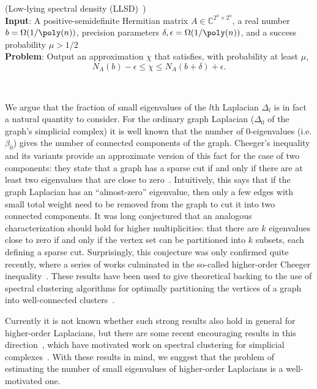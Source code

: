 \documentclass[11pt]{article}
\numberwithin{equation}{section}
\newcommand\equ[1] {\begin{equation}#1\end{equation}}
\renewcommand\( {\left(}
\renewcommand\) {\right)}
\newcounter{mycount}
\newcommand\myprob[3]{%
   \stepcounter{mycount}
 \par\noindent   {\bfseries Definition\  \themycount} (#1)\\
   {\bfseries Input}: #2\\
   {\bfseries Problem}: #3\par
}
\begin{document}
\myprob{Low-lying spectral density ({\sc LLSD})~\cite{gyurik}}{A positive-semidefinite Hermitian matrix $A \in \mathbb{C}^{2^n \times 2^n}$, a real number $b = \Omega(1/\poly(n))$, precision parameters $\delta, \epsilon = \Omega(1/\poly(n))$, and a success probability $\mu > 1/2$}{Output an approximation $\chi$ that satisfies, with probability at least $\mu$, \equ{N_A(b) - \epsilon \leq \chi \leq N_A(b+\delta) + \epsilon.}}

\

We argue that the fraction of small eigenvalues of the $l$th Laplacian $\Delta_l$ is in fact a natural quantity to consider. For the ordinary graph Laplacian ($\Delta_0$ of the graph's simplicial complex) it is well known that the number of $0$-eigenvalues (i.e. $\beta_0$) gives the number of connected components of the graph. Cheeger’s inequality and its variants provide an approximate version of this fact for the case of two components: they state that a graph has a sparse cut if and only if there are at least two eigenvalues that are close to zero~\cite{alon1986eigenvalues}. Intuitively, this says that if the graph Laplacian has an ``almost-zero'' eigenvalue, then only a few edges with small total weight need to be removed from the graph to cut it into two connected components. It was long conjectured that an analogous characterization should hold for higher multiplicities: that there are $k$ eigenvalues close to zero if and only if the vertex set can be partitioned into $k$ subsets, each defining a sparse cut. Surprisingly, this conjecture was only confirmed quite recently, where a series of works culminated in the so-called higher-order Cheeger inequality~\cite{lee2014multiway}. These results have been used to give theoretical backing to the use of spectral clustering algorithms for optimally partitioning the vertices of a graph into well-connected clusters~\cite{peng2015partitioning}. 

Currently it is not known whether such strong results also hold in general for higher-order Laplacians, but there are some recent encouraging results in this direction~\cite{parzanchevski2016isoperimetric, horak2013spectra, steenbergen2014cheeger, gundert2014higher}, which have motivated work on spectral clustering for simplicial complexes~\cite{palande2020spectral}. With these results in mind, we suggest that the problem of estimating the number of small eigenvalues of higher-order Laplacians is a well-motivated one. 

\ 
\end{document}
